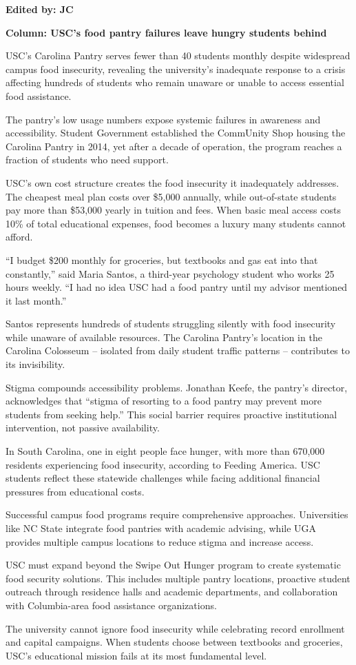 \documentclass[12pt]{article}
\begin{document}
\begin{newversion}
\textbf{Edited by: JC}

\textbf{Column: USC's food pantry failures leave hungry students behind}

USC's Carolina Pantry serves fewer than 40 students monthly despite widespread campus food insecurity, revealing the university's inadequate response to a crisis affecting hundreds of students who remain unaware or unable to access essential food assistance.

The pantry's low usage numbers expose systemic failures in awareness and accessibility. Student Government established the CommUnity Shop housing the Carolina Pantry in 2014, yet after a decade of operation, the program reaches a fraction of students who need support.

USC's own cost structure creates the food insecurity it inadequately addresses. The cheapest meal plan costs over \$5,000 annually, while out-of-state students pay more than \$53,000 yearly in tuition and fees. When basic meal access costs 10\% of total educational expenses, food becomes a luxury many students cannot afford.

``I budget \$200 monthly for groceries, but textbooks and gas eat into that constantly,'' said Maria Santos, a third-year psychology student who works 25 hours weekly. ``I had no idea USC had a food pantry until my advisor mentioned it last month.''

Santos represents hundreds of students struggling silently with food insecurity while unaware of available resources. The Carolina Pantry's location in the Carolina Colosseum – isolated from daily student traffic patterns – contributes to its invisibility.

Stigma compounds accessibility problems. Jonathan Keefe, the pantry's director, acknowledges that ``stigma of resorting to a food pantry may prevent more students from seeking help.'' This social barrier requires proactive institutional intervention, not passive availability.

In South Carolina, one in eight people face hunger, with more than 670,000 residents experiencing food insecurity, according to Feeding America. USC students reflect these statewide challenges while facing additional financial pressures from educational costs.

Successful campus food programs require comprehensive approaches. Universities like NC State integrate food pantries with academic advising, while UGA provides multiple campus locations to reduce stigma and increase access.

USC must expand beyond the Swipe Out Hunger program to create systematic food security solutions. This includes multiple pantry locations, proactive student outreach through residence halls and academic departments, and collaboration with Columbia-area food assistance organizations.

The university cannot ignore food insecurity while celebrating record enrollment and capital campaigns. When students choose between textbooks and groceries, USC's educational mission fails at its most fundamental level.
\end{newversion}
\end{document}
